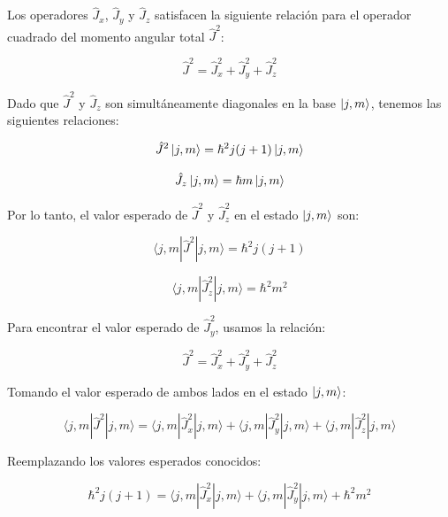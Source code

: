 Los operadores $\hat{J}_x$, $\hat{J}_y$ y $\hat{J}_z$ satisfacen la siguiente relación para el operador cuadrado del momento angular total $\hat{J}^2$:

\begin{equation}
\hat{J}^2 = \hat{J}_x^2 + \hat{J}_y^2 + \hat{J}_z^2
\end{equation}

Dado que $\hat{J}^2$ y $\hat{J}_z$ son simultáneamente diagonales en la base $\ket{j, m}$, tenemos las siguientes relaciones:

\begin{equation}
\hat{J}^2 \ket{j, m} = \hbar^2 j(j+1) \ket{j, m}
\end{equation}

\begin{equation}
\hat{J}_z \ket{j, m} = \hbar m \ket{j, m}
\end{equation}

Por lo tanto, el valor esperado de $\hat{J}^2$ y $\hat{J}_z^2$ en el estado $\ket{j, m}$ son:

\begin{equation}
\langle j, m | \hat{J}^2 | j, m \rangle = \hbar^2 j(j+1)
\end{equation}

\begin{equation}
\langle j, m | \hat{J}_z^2 | j, m \rangle = \hbar^2 m^2
\end{equation}

Para encontrar el valor esperado de $\hat{J}_y^2$, usamos la relación:

\begin{equation}
\hat{J}^2 = \hat{J}_x^2 + \hat{J}_y^2 + \hat{J}_z^2
\end{equation}

Tomando el valor esperado de ambos lados en el estado $\ket{j, m}$:

\begin{equation}
\langle j, m | \hat{J}^2 | j, m \rangle = \langle j, m | \hat{J}_x^2 | j, m \rangle + \langle j, m | \hat{J}_y^2 | j, m \rangle + \langle j, m | \hat{J}_z^2 | j, m \rangle
\end{equation}

Reemplazando los valores esperados conocidos:

\begin{equation}
\hbar^2 j(j+1) = \langle j, m | \hat{J}_x^2 | j, m \rangle + \langle j, m | \hat{J}_y^2 | j, m \rangle + \hbar^2 m^2
\end{equation}

